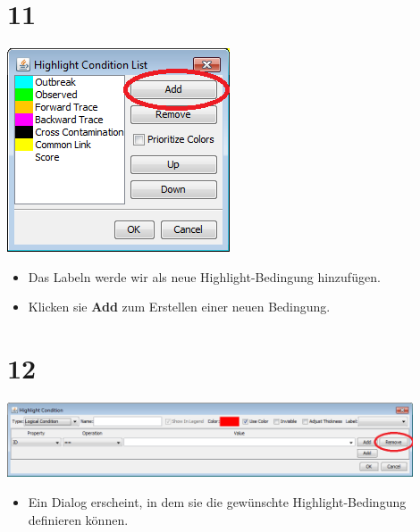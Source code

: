 \documentclass{beamer}
\begin{document}
\section{11}
\begin{frame}
	\begin{center}
  		\includegraphics[height=0.6\textheight]{11.png}
	\end{center}
	\begin{itemize}
		\item Das Labeln werde wir als neue Highlight-Bedingung hinzufügen.
		\item Klicken sie \textbf{Add} zum Erstellen einer neuen Bedingung.
	\end{itemize}
\end{frame}

\section{12}
\begin{frame}
	\begin{center}
  		\includegraphics[width=0.9\textwidth]{12.png}
	\end{center}
	\begin{itemize}
		\item Ein Dialog erscheint, in dem sie die gewünschte Highlight-Bedingung definieren können.
	\end{itemize}
\end{frame}
\end{document}
